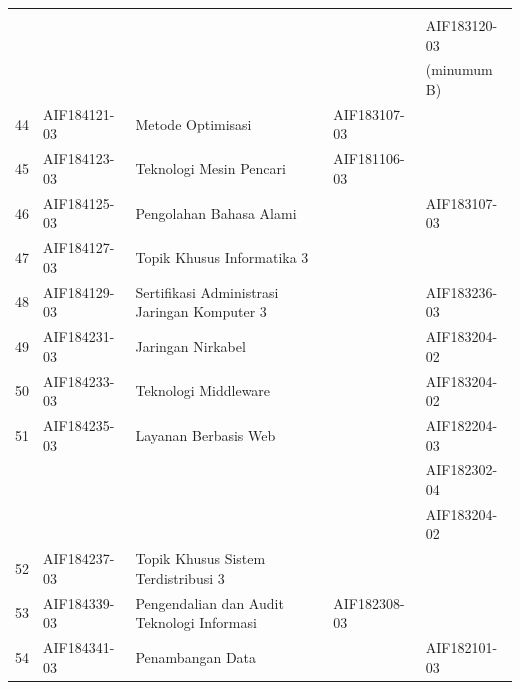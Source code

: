 \begin{table}[H]
\begin{tabular}{|p{0.5cm}|p{2.85cm}|p{4.95cm}|p{2.7cm}|p{2.7cm}|}
   &              &                                                                  &              &                    \\
   &              &                                                                  &              & AIF183120-03       \\
   &              &                                                                  &              & (minumum B)        \\ \hline
44 & AIF184121-03 & Metode Optimisasi                                                & AIF183107-03 &                    \\ \hline
45 & AIF184123-03 & Teknologi Mesin Pencari                                          & AIF181106-03 &                    \\ \hline
46 & AIF184125-03 & Pengolahan Bahasa Alami                                          &              & AIF183107-03       \\ \hline
47 & AIF184127-03 & Topik Khusus Informatika 3                                       &              &                    \\ \hline
48 & AIF184129-03 & Sertifikasi Administrasi Jaringan Komputer 3                     &              & AIF183236-03       \\ \hline
49 & AIF184231-03 & Jaringan Nirkabel                                                &              & AIF183204-02       \\ \hline
50 & AIF184233-03 & Teknologi Middleware                                             &              & AIF183204-02       \\ \hline
51 & AIF184235-03 & Layanan Berbasis Web                                             &              & AIF182204-03       \\ 
   &              &                                                                  &              & AIF182302-04       \\ 
   &              &                                                                  &              & AIF183204-02       \\ \hline
52 & AIF184237-03 & Topik Khusus Sistem Terdistribusi 3                              &              &                    \\ \hline
53 & AIF184339-03 & Pengendalian dan Audit Teknologi Informasi                       & AIF182308-03 &                    \\ \hline
54 & AIF184341-03 & Penambangan Data                                                 &              & AIF182101-03       \\ \hline

\end{tabular}
\end{table}
